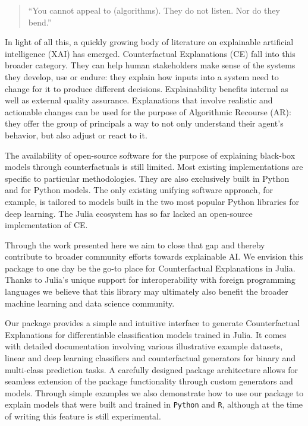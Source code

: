 \documentclass{juliacon}
\begin{document}
\begin{quote}
``You cannot appeal to (algorithms). They do not listen. Nor do they
bend.'' \cite{oneil2016weapons}
\end{quote}

In light of all this, a quickly growing body of literature on
explainable artificial intelligence (XAI) has emerged. Counterfactual
Explanations (CE) fall into this broader category. They can help human
stakeholders make sense of the systems they develop, use or endure: they
explain how inputs into a system need to change for it to produce
different decisions. Explainability benefits internal as well as
external quality assurance. Explanations that involve realistic and
actionable changes can be used for the purpose of Algorithmic Recourse
(AR): they offer the group of principals a way to not only understand
their agent's behavior, but also adjust or react to it.

The availability of open-source software for the purpose of explaining
black-box models through counterfactuals is still limited. Most existing
implementations are specific to particular methodologies. They are also
exclusively built in Python and for Python models. The only existing
unifying software approach, for example, is tailored to models built in
the two most popular Python libraries for deep learning. The Julia
ecosystem has so far lacked an open-source implementation of CE.

Through the work presented here we aim to close that gap and thereby
contribute to broader community efforts towards explainable AI. We
envision this package to one day be the go-to place for Counterfactual
Explanations in Julia. Thanks to Julia's unique support for
interoperability with foreign programming languages we believe that this
library may ultimately also benefit the broader machine learning and
data science community.

Our package provides a simple and intuitive interface to generate
Counterfactual Explanations for differentiable classification models
trained in Julia. It comes with detailed documentation involving various
illustrative example datasets, linear and deep learning classifiers and
counterfactual generators for binary and multi-class prediction tasks. A
carefully designed package architecture allows for seamless extension of
the package functionality through custom generators and models. Through
simple examples we also demonstrate how to use our package to explain
models that were built and trained in \texttt{Python} and \texttt{R},
although at the time of writing this feature is still experimental.
\end{document}
